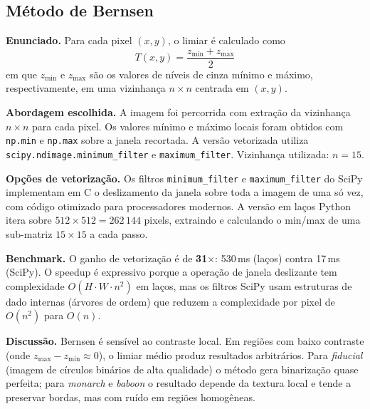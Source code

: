 \documentclass[12pt,a4paper]{article}
\newcommand{\campo}[2]{\textbf{#1.} #2\par}
\begin{document}
\subsection{Método de Bernsen \cite{bernsen1986}}

\campo{Enunciado}{Para cada pixel $(x,y)$, o limiar é calculado como
\begin{equation}
  T(x,y) = \frac{z_{\min} + z_{\max}}{2}
\end{equation}
em que $z_{\min}$ e $z_{\max}$ são os valores de níveis de cinza mínimo e máximo,
respectivamente, em uma vizinhança $n \times n$ centrada em $(x,y)$.}

\campo{Abordagem escolhida}{A imagem foi percorrida com extração da vizinhança $n \times n$
para cada pixel. Os valores mínimo e máximo locais foram obtidos com \texttt{np.min} e
\texttt{np.max} sobre a janela recortada. A versão vetorizada utiliza
\texttt{scipy.ndimage.minimum\_filter} e \texttt{maximum\_filter}. Vizinhança utilizada:
$n = 15$.}

\campo{Opções de vetorização}{Os filtros \texttt{minimum\_filter} e \texttt{maximum\_filter}
do SciPy implementam em C o deslizamento da janela sobre toda a imagem de uma só vez, com
código otimizado para processadores modernos. A versão em laços Python itera sobre
$512\times512 = 262\,144$ pixels, extraindo e calculando o min/max de uma sub-matriz $15\times15$
a cada passo.}

\campo{Benchmark}{O ganho de vetorização é de \textbf{31$\times$}: 530\,ms (laços) contra
17\,ms (SciPy). O speedup é expressivo porque a operação de janela deslizante tem
complexidade $O(H \cdot W \cdot n^2)$ em laços, mas os filtros SciPy usam estruturas de
dado internas (árvores de ordem) que reduzem a complexidade por pixel de $O(n^2)$ para
$O(n)$.}

\campo{Discussão}{Bernsen é sensível ao contraste local. Em regiões com baixo contraste
(onde $z_{\max} - z_{\min} \approx 0$), o limiar médio produz resultados arbitrários. Para
\textit{fiducial} (imagem de círculos binários de alta qualidade) o método gera binarização
quase perfeita; para \textit{monarch} e \textit{baboon} o resultado depende da textura local
e tende a preservar bordas, mas com ruído em regiões homogêneas.}
\end{document}
